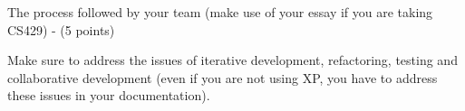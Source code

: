 The process followed by your team (make use of your essay if you are taking CS429) - (5 points)

Make sure to address the issues of iterative development, refactoring, testing and collaborative development (even if you are not using XP, you have to address these issues in your documentation).

